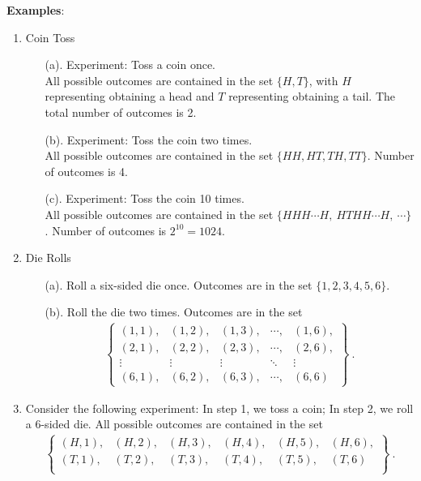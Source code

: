 \documentclass[11pt,oneside]{book}
\theoremstyle{newStyle}
\begin{document}

\textbf{Examples}: 
\begin{enumerate}
\item Coin Toss
\begin{enumerate}
\item[(a).] Experiment: Toss a coin once. \\
All possible outcomes are contained in the set $\{H,T\}$, with $H$ representing obtaining a head and $T$ representing obtaining a tail. The total number of outcomes is 2. 
\item[(b).] Experiment: Toss the coin two times.\\
All possible outcomes are contained in the set $\{HH, HT, TH, TT\}$. Number of outcomes is 4. 
\item[(c).] Experiment: Toss the coin 10 times.\\
All possible outcomes are contained in the set $\{HHH\cdots H,\ HTHH\cdots H,\ \cdots\}$. Number of outcomes is $2^{10}=1024$. 
\end{enumerate}


\item Die Rolls
\begin{enumerate}
\item[(a).] Roll a six-sided die once. 
Outcomes are in the set $\{1,2,3,4,5,6\}$.
\item[(b).] Roll the die two times. Outcomes are in the set
\begin{align*}
\left\{
\begin{matrix}
(1,1), & (1,2), & (1,3), & \cdots , & (1,6),\\
(2,1), & (2,2), & (2,3), & \cdots , & (2,6),\\
\vdots & \vdots & \vdots & \ddots  & \vdots\\
(6,1), & (6,2), & (6,3), & \cdots , & (6,6)
\end{matrix}
\right\}\ .
\end{align*}
\end{enumerate}

\item Consider the following experiment: In step 1, we toss a coin; In step 2, we roll a 6-sided die. All possible outcomes are contained in the set
\begin{align*}
\left\{
\begin{matrix}
(H,1), &(H,2), &(H,3),& (H,4),& (H,5),& (H,6), \\
(T,1),& (T,2), &(T,3), &(T,4),& (T,5), &(T,6) \\
\end{matrix}
\right\}\ .
\end{align*}


\end{enumerate}
\end{document}
